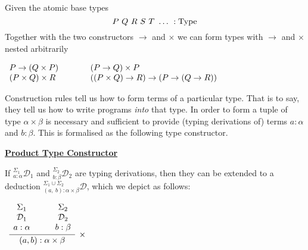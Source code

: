 \documentclass{book}
\begin{document}
        \begin{eg}
            
            Given the atomic base types $$P \ Q \ R \ S \ T \ \dots \ : \type $$ Together with the two constructors $\to$ and $\times$ we can form types with $\to$ and $\times$ nested arbitrarily
            
            \begin{center}
                $\begin{array}{l l}
                    
                    P \to (Q \times P) \hspace{1cm} & (P \to Q) \times P \\
                    (P \times Q) \times R & ((P \times Q) \to R) \to (P \to (Q \to R))
                \end{array}$
            \end{center}

        \end{eg}

        Construction rules tell us how to form terms of a particular type. That is to say, they tell us how to write programs \emph{into} that type. In order to form a tuple of type $\alpha \times \beta$ is necessary and sufficient to provide (typing derivations of) terms $a : \alpha$ and $b : \beta$. This is formalised as the following type constructor.

        \begin{mdframed}

            \underline{{\bf Product Type Constructor}}

            If $^{\Sigma_{1}}_{a : \alpha}\mathcal{D}_{1}$ and $^{\Sigma_{2}}_{b : \beta}\mathcal{D}_{2}$ are typing derivations, then they can be extended to a deduction $^{\Sigma_{1}\cup \Sigma_{2}}_{(a, \ b) : \alpha \times \beta}\mathcal{D}$, which we depict as follows: 

            \begin{center}
                $\begin{array}{c}		
                    \infer[\times]{(a, b) : \alpha \times \beta}{\begin{array}{c} \Sigma_{1} \\ \mathcal{D}_{1} \\ a : \alpha \end{array} \quad & \begin{array}{c} \Sigma_{2} \\ \mathcal{D}_{2} \\  b : \beta \end{array}}	
                \end{array}$
            \end{center}
        \end{mdframed}
\end{document}
